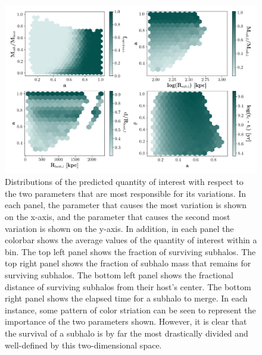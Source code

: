 \documentclass[fleqn,usenatbib]{mnras}
\begin{document}
\begin{figure}
	\includegraphics[width=\textwidth]{Figures/bestSpaces}
	\vspace{-15pt}
    \caption{Distributions of the predicted quantity of interest with respect to the two parameters that are most responsible for its variations. In each panel, the parameter that causes the most variation is shown on the x-axis, and the parameter that causes the second most variation is shown on the y-axis. In addition, in each panel the colorbar shows the average values of the quantity of interest within a bin. The top left panel shows the fraction of surviving subhalos. The top right panel shows the fraction of subhalo mass that remains for surviving subhalos. The bottom left panel shows the fractional distance of surviving subhalos from their host's center. The bottom right panel shows the elapsed time for a subhalo to merge. In each instance, some pattern of color striation can be seen to represent the importance of the two parameters shown. However, it is clear that the survival of a subhalo is by far the most drastically divided and well-defined by this two-dimensional space. }
    \label{fig:bestSpaces}
\end{figure}
\end{document}
